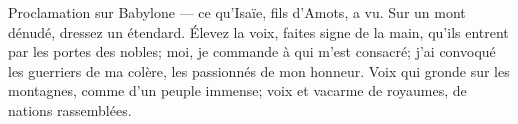 Proclamation sur Babylone --- ce qu’Isaïe, fils d’Amots, a vu.
Sur un mont dénudé, dressez un étendard.
Élevez la voix, faites signe de la main, qu’ils entrent par les portes des nobles;
	moi, je commande à qui m’est consacré;
	j’ai convoqué les guerriers de ma colère, les passionnés de mon honneur.
Voix qui gronde sur les montagnes, comme d’un peuple immense;
	voix et vacarme de royaumes, de nations rassemblées.
